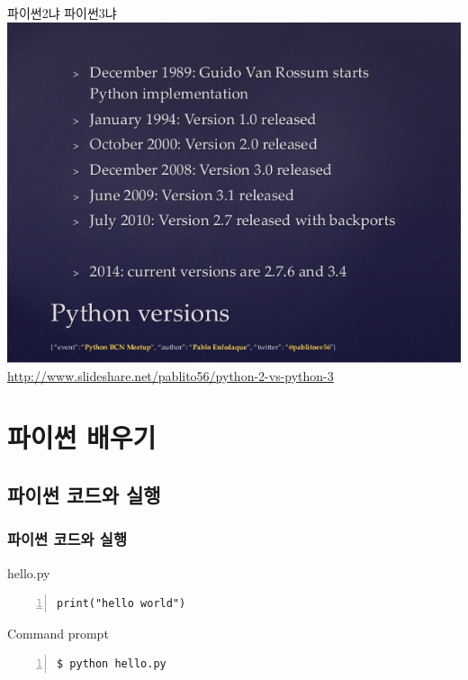 \documentclass[10pt]{beamer}
\begin{document}
\begin{frame}{파이썬2냐 파이썬3냐}{}
\centering
\includegraphics[scale=0.4]{contents/python23.jpg}\\
\tiny{\url{http://www.slideshare.net/pablito56/python-2-vs-python-3}}
\end{frame}


\section{파이썬 배우기}
\subsection{파이썬 코드와 실행}
\begin{frame}[fragile]
\frametitle{파이썬 코드와 실행}
hello.py
\begin{Verbatim}[numbers=left]
print("hello world")
\end{Verbatim}
\vspace{10mm}
Command prompt
\begin{Verbatim}[numbers=left]
$ python hello.py
\end{Verbatim}

\end{frame}
\end{document}
